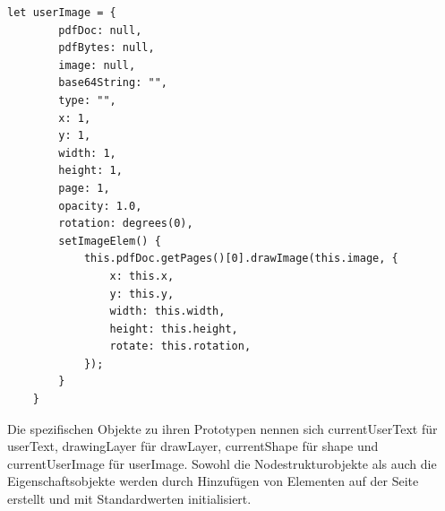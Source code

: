 \begin{lstlisting}[style=ES6, caption={Prototyp-Objekt für die imagespezifischen Eigenschaften}, label=code:user-image, breaklines=true]
	let userImage = {
		pdfDoc: null,
		pdfBytes: null,
		image: null,
		base64String: "",
		type: "",
		x: 1,
		y: 1,
		width: 1,
		height: 1,
		page: 1,
		opacity: 1.0,
		rotation: degrees(0),
		setImageElem() {
			this.pdfDoc.getPages()[0].drawImage(this.image, {
				x: this.x,
				y: this.y,
				width: this.width,
				height: this.height,
				rotate: this.rotation,
			});
		}
	}
\end{lstlisting}

Die spezifischen Objekte zu ihren Prototypen nennen sich currentUserText für userText, drawingLayer für drawLayer, currentShape für shape und currentUserImage für userImage. Sowohl die Nodestrukturobjekte als auch die Eigenschaftsobjekte werden durch Hinzufügen von Elementen auf der Seite erstellt und mit Standardwerten initialisiert. 

